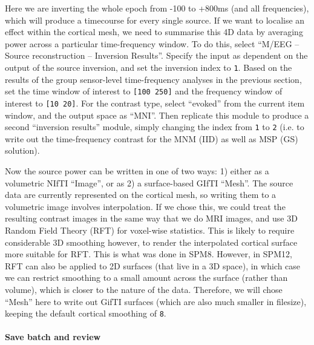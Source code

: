 Here we are inverting the whole epoch from -100 to +800ms (and all frequencies), which will produce a timecourse for every single source. If we want to localise an effect within the cortical mesh, we need to summarise this 4D data by averaging power across a particular time-frequency window. To do this, select ``M/EEG -- Source reconstruction -- Inversion Results''. Specify the input as dependent on the output of the source inversion, and set the inversion index to \texttt{1}. Based on the results of the group sensor-level time-frequency analyses in the previous section, set the time window of interest to \texttt{[100 250]} and the frequency window of interest to \texttt{[10 20]}. For the contrast type, select ``evoked'' from the current item window, and the output space as ``MNI''. Then replicate this module to produce a second ``inversion results'' module, simply changing the index from \texttt{1} to \texttt{2} (i.e. to write out the time-frequency contrast for the MNM (IID) as well as MSP (GS) solution).

Now the source power can be written in one of two ways: 1) either as a volumetric NIfTI ``Image'', or as 2) a surface-based GIfTI ``Mesh''. The source data are currently represented on the cortical mesh, so writing them to a volumetric image involves interpolation. If we chose this, we could treat the resulting contrast images in the same way that we do MRI images, and use 3D Random Field Theory (RFT) for voxel-wise statistics. This is likely to require considerable 3D smoothing however, to render the interpolated cortical surface more suitable for RFT. This is what was done in SPM8. However, in SPM12, RFT can also be applied to 2D surfaces (that live in a 3D space), in which case we can restrict smoothing to a small amount across the surface (rather than volume), which is closer to the nature of the data. Therefore, we will chose ``Mesh'' here to write out GifTI surfaces (which are also much smaller in filesize), keeping the default cortical smoothing of \texttt{8}.

\paragraph{Save batch and review}

